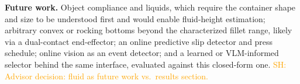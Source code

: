 \documentclass[10pt, conference]{IEEEtran}
\newcommand{\sh}[1]{\textcolor{orange}{SH: #1}}
\begin{document}
\noindent \textbf{Future work.} Object compliance and liquids, which require the container shape and size to be understood first and would enable fluid-height estimation; arbitrary convex or rocking bottoms beyond the characterized fillet range, likely via a dual-contact end-effector; an online predictive slip detector and press schedule; online vision as an event detector; and a learned or VLM-informed selector behind the same interface, evaluated against this closed-form one. \sh{Advisor decision: fluid as future work vs.\ results section.}

\nocite{hyland_before_2026}

\end{document}
